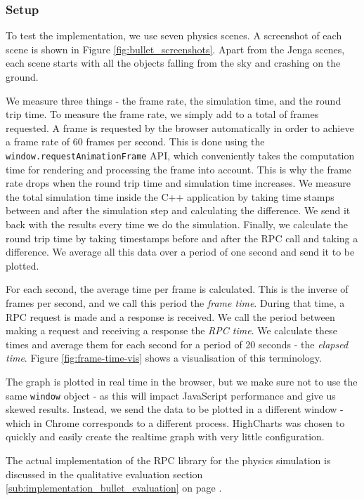 \subsubsection{Setup} %
\label{ssub:bullet_performance_setup}
To test the implementation, we use seven physics scenes. A screenshot of each scene is shown in Figure \ref{fig:bullet_screenshots}. Apart from the Jenga scenes, each scene starts with all the objects falling from the sky and crashing on the ground.

We measure three things - the frame rate, the simulation time, and the round trip time. To measure the frame rate, we simply add to a total of frames requested. A frame is requested by the browser automatically in order to achieve a frame rate of 60 frames per second. This is done using the \lstinline{window.requestAnimationFrame} API, which conveniently takes the computation time for rendering and processing the frame into account. This is why the frame rate drops when the round trip time and simulation time increases. We measure the total simulation time inside the C++ application by taking time stamps between and after the simulation step and calculating the difference. We send it back with the results every time we do the simulation. Finally, we calculate the round trip time by taking timestamps before and after the RPC call and taking a difference. We average all this data over a period of one second and send it to be plotted.

For each second, the average time per frame is calculated. This is the inverse of frames per second, and we call this period the \emph{frame time}. During that time, a RPC request is made and a response is received. We call the period between making a request and receiving a response the \emph{RPC time}. We calculate these times and average them for each second for a period of 20 seconds - the \emph{elapsed time}. Figure \ref{fig:frame-time-vis} shows a visualisation of this terminology.

The graph is plotted in real time in the browser, but we make sure not to use the same \lstinline{window} object - as this will impact JavaScript performance and give us skewed results. Instead, we send the data to be plotted in a different window - which in Chrome corresponds to a different process. HighCharts was chosen to quickly and easily create the realtime graph with very little configuration.

The actual implementation of the RPC library for the physics simulation is discussed in the qualitative evaluation section \ref{sub:implementation_bullet_evaluation} on page \pageref{sub:implementation_bullet_evaluation}.

